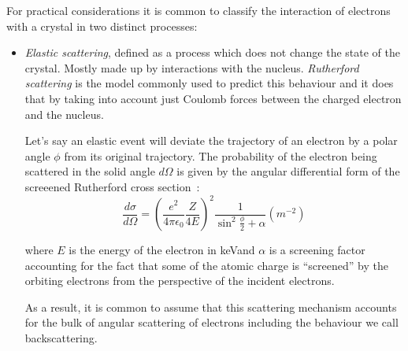 For practical considerations it is common to classify the interaction of electrons with a crystal in two distinct processes:
\begin{itemize}
\item \textit{Elastic scattering}, defined as a process which does not change the state of the crystal. Mostly made up by interactions with the nucleus. \textit{Rutherford scattering} is the model commonly used to predict this behaviour and it does that by taking into account just Coulomb forces between the charged electron and the nucleus. 

Let's say an elastic event will deviate the trajectory of an electron by a polar angle $\phi$ from its original trajectory. The probability of the electron being scattered in the solid angle ${d \Omega}$ is given by the angular differential form of the screeened Rutherford cross section~\cite{Reimer76}:
\begin{equation*}
\frac{d \sigma}{d \Omega} = \left( \frac{e^2 }{4 \pi \epsilon_0 } \frac{Z}{4 E}\right)^2 \frac{1}{\sin^2{\frac{\phi}{2}} + \alpha} (\si{m^{-2}})
\end{equation*}

where $E$ is the energy of the electron in \si{\kilo eV}and $\alpha$ is a screening factor accounting for the fact that some of the atomic charge is ``screened'' by the orbiting electrons from the perspective of the incident electrons.

As a result, it is common to assume that this scattering mechanism accounts for  the bulk of angular scattering of electrons including the behaviour we call backscattering.



\end{itemize}
